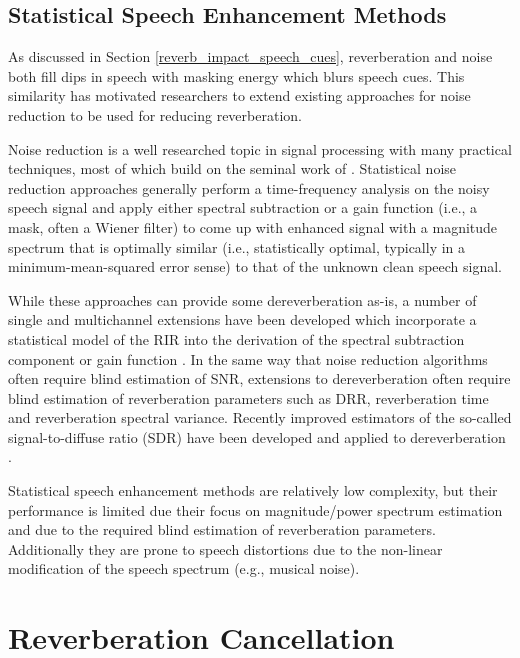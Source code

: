 \subsection{Statistical Speech Enhancement Methods} \label{section:speech_enhancement}

As discussed in Section \ref{reverb_impact_speech_cues}, reverberation and noise both fill dips in speech with masking energy which blurs speech cues. This similarity has motivated researchers to extend existing approaches for noise reduction to be used for reducing reverberation. 

Noise reduction is a well researched topic in signal processing with many practical techniques, most of which build on the seminal work of \cite{ephraim1984speech, ephraim1985speech}. Statistical noise reduction approaches generally perform a time-frequency analysis on the noisy speech signal and apply either spectral subtraction or a gain function (i.e., a mask, often a Wiener filter) to come up with enhanced signal with a magnitude spectrum that is optimally similar (i.e., statistically optimal, typically in a minimum-mean-squared error sense) to that of the unknown clean speech signal.

While these approaches can provide some dereverberation as-is, a number of single and multichannel extensions have been developed which incorporate a statistical model of the RIR \citep[e.g., Polack's Model, ][]{polack1988transmission} into the derivation of the spectral subtraction component or gain function \citep{lebart2001new, habets2005multi, habets2007single, erkelens2010correlation, braun2013informed, schwartz2014multi}. In the same way that noise reduction algorithms often require blind estimation of SNR, extensions to dereverberation often require blind estimation of reverberation parameters such as DRR, reverberation time and reverberation spectral variance. Recently improved estimators of the so-called signal-to-diffuse ratio (SDR) have been developed and applied to dereverberation \citep{thiergart2012signal, thiergart2014power}. 

Statistical speech enhancement methods are relatively low complexity, but their performance is limited due their focus on magnitude/power spectrum estimation and due to the required blind estimation of reverberation parameters. Additionally they are prone to speech distortions due to the non-linear modification of the speech spectrum (e.g., musical noise). 

\section{Reverberation Cancellation}

